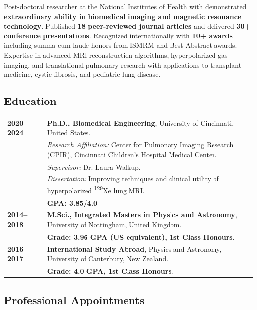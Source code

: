 \documentclass[11pt,]{scrartcl}
\begin{document}
Post-doctoral researcher at the National Institutes of Health with demonstrated \textbf{extraordinary ability in biomedical imaging and magnetic resonance technology}. Published \textbf{18 peer-reviewed journal articles} and delivered \textbf{30+ conference presentations}. Recognized internationally with \textbf{10+ awards} including summa cum laude honors from ISMRM and Best Abstract awards. Expertise in advanced MRI reconstruction algorithms, hyperpolarized gas imaging, and translational pulmonary research with applications to transplant medicine, cystic fibrosis, and pediatric lung disease.

\subsection{Education}

\begin{table}[h!]
{\def\arraystretch{1.4}\tabcolsep=0pt %
\begin{tabular}{p{0.16\linewidth}p{0.84\linewidth}}

  \textbf{2020--2024} & \textbf{Ph.D., Biomedical Engineering}, University of Cincinnati, United States. \\
  
  & \textit{Research Affiliation:} Center for Pulmonary Imaging Research (CPIR), Cincinnati Children's Hospital Medical Center. \\
  & \textit{Supervisor:} Dr. Laura Walkup. \\
  & \textit{Dissertation:} Improving techniques and clinical utility of hyperpolarized \textsuperscript{129}Xe lung MRI. \\
  & \textbf{GPA: 3.85/4.0} \\[0.2cm]
  
  \textbf{2014--2018} & \textbf{M.Sci., Integrated Masters in Physics and Astronomy}, University of Nottingham, United Kingdom. \\
  & \textbf{Grade: 3.96 GPA (US equivalent), 1st Class Honours}. \\[0.2cm]

  \textbf{2016--2017} & \textbf{International Study Abroad}, Physics and Astronomy, University of Canterbury, New Zealand. \\
  & \textbf{Grade: 4.0 GPA, 1st Class Honours}. 
\end{tabular}%
}
\end{table}

\subsection{Professional Appointments}
\end{document}
